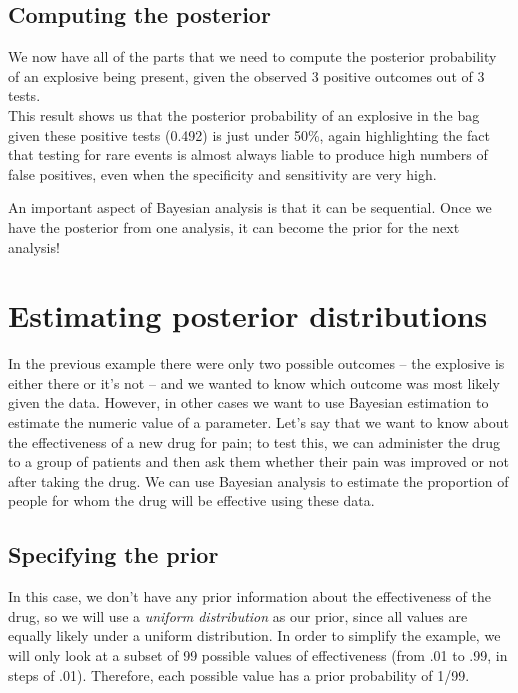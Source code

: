 \documentclass[12pt,]{book}
\theoremstyle{definition}
\theoremstyle{definition}
\theoremstyle{definition}
\theoremstyle{remark}
\begin{document}
\hypertarget{computing-the-posterior}{%
\subsection{Computing the posterior}\label{computing-the-posterior}}

We now have all of the parts that we need to compute the posterior probability of an explosive being present, given the observed 3 positive outcomes out of 3 tests.\\
This result shows us that the posterior probability of an explosive in the bag given these positive tests (0.492) is just under 50\%, again highlighting the fact that testing for rare events is almost always liable to produce high numbers of false positives, even when the specificity and sensitivity are very high.

An important aspect of Bayesian analysis is that it can be sequential. Once we have the posterior from one analysis, it can become the prior for the next analysis!

\hypertarget{estimating-posterior-distributions}{%
\section{Estimating posterior distributions}\label{estimating-posterior-distributions}}

In the previous example there were only two possible outcomes -- the explosive is either there or it's not -- and we wanted to know which outcome was most likely given the data. However, in other cases we want to use Bayesian estimation to estimate the numeric value of a parameter. Let's say that we want to know about the effectiveness of a new drug for pain; to test this, we can administer the drug to a group of patients and then ask them whether their pain was improved or not after taking the drug. We can use Bayesian analysis to estimate the proportion of people for whom the drug will be effective using these data.

\hypertarget{specifying-the-prior-1}{%
\subsection{Specifying the prior}\label{specifying-the-prior-1}}

In this case, we don't have any prior information about the effectiveness of the drug, so we will use a \emph{uniform distribution} as our prior, since all values are equally likely under a uniform distribution. In order to simplify the example, we will only look at a subset of 99 possible values of effectiveness (from .01 to .99, in steps of .01). Therefore, each possible value has a prior probability of 1/99.
\end{document}
